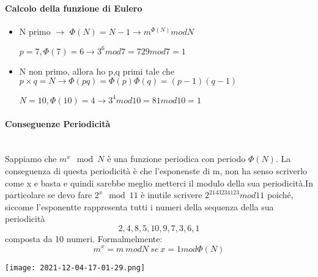 \documentclass{article}
\theoremstyle{remark}
\begin{document}
\paragraph{Calcolo della funzione di Eulero}
\begin{itemize}
	\item N primo \(\rightarrow\) \(\Phi(N)=N-1\rightarrow m^{\Phi(N)}mod N\)
	\begin{center}
		\(p=7,\Phi(7)=6\rightarrow 3^6 mod 7=729 mod 7=1\)
	\end{center}
	\item N non primo, allora ho p,q primi tale che \(p\times q=N\rightarrow \Phi(pq)=\Phi(p)\Phi(q)=(p-1)(q-1)\)
	\begin{center}
		\(N=10,\Phi(10)=4\rightarrow 3^4 mod 10 = 81 mod 10 = 1\)
	\end{center}
\end{itemize}
\paragraph{Conseguenze Periodicità}\mbox{}\\ Sappiamo che \(m^x \mod N \) è una funzione periodica con periodo \(\Phi(N)\). La conseguenza di questa periodicità è che l'esponenste di m, non ha senso scriverlo come x e basta e quindi sarebbe meglio metterci il modulo della sua periodicità.\newline In particolare se devo fare \(2^x \mod 11\) è inutile scrivere \(2^{2143234123} mod 11\) poiché, siccome l'esponentte rappresenta tutti i numeri della sequenza della sua periodicità \[2,4,8,5,10,9,7,3,6,1\] composta da 10 numeri. Formalmelmente:\begin{equation}
	m^x=m\ mod N\ se\ x=1 mod\Phi(N)
\end{equation}
\begin{center}
	\texttt{[image: 2021-12-04-17-01-29.png]}
\end{center}
\end{document}
